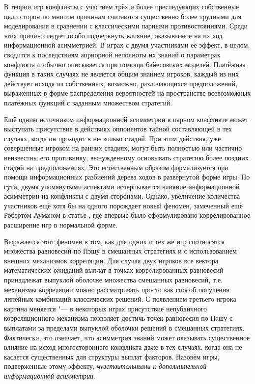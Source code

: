 
{\actuality} В теории игр конфликты с участием трёх и более преследующих собственные цели сторон по многим причинам считаются существенно более трудными для моделирования в сравнении с классическими парными противостояниями. Среди этих причин следует особо подчеркнуть влияние, оказываемое на их ход информационной асимметрией. В играх с двумя участниками её эффект, в целом, сводится к последствиям априорной неполноты их знаний о параметрах конфликта и обычно описывается при помощи байесовских моделей. Платёжная функция в таких случаях не является общим знанием игроков, каждый из них действует исходя из собственных, возможно, различающихся предположений, выраженных в форме распределения вероятностей на пространстве всевозможных платёжных функций с заданным множеством стратегий.

Ещё одним источником информационной асимметрии в парном конфликте может выступать присутствие в действиях оппонентов тайной составляющей в тех случаях, когда он проходит в несколько стадий. При этом действия, уже совершённые игроком на ранних стадиях, могут быть полностью или частично неизвестны его противнику, вынужденному основывать стратегию более поздних стадий на предположениях. Это естественным образом формализуется при помощи информационных разбиений дерева ходов в развёрнутой форме игры. По сути, двумя упомянутыми аспектами исчерпывается влияние информационной асимметрии на конфликты с двумя сторонами. Однако, увеличение количества участников ещё хотя бы на одного порождает новый феномен, замеченный ещё Робертом Ауманом в статье \ifsynopsis\smartcite{Aumann74}\else\cite{Aumann74}\fi, где впервые было сформулировано коррелированное расширение игр в нормальной форме.

Выражается этот феномен в том, как для одних и тех же игр соотносятся множества равновесий по Нэшу в смешанных стратегиях и с использованием внешних механизмов корреляции. Для случая двух игроков все вектора математических ожиданий выплат в точках коррелированных равновесий принадлежат выпуклой оболочке множества смешанных равновесий, т.\:е. механизмы корреляции можно рассматривать просто как способ получения линейных комбинаций классических решений. С появлением третьего игрока картина меняется "--- в некоторых играх присутствие непубличного корреляционного механизма позволяет достичь точек равновесия по Нэшу с выплатами за пределами выпуклой оболочки решений в смешанных стратегиях. Фактически, это означает, что асимметрия знаний может оказывать существенное влияние на исход многостороннего конфликта даже в тех случаях, когда она не касается существенных для структуры выплат факторов. Назовём игры, подверженные этому эффекту, \emph{чувствительными к дополнительной информационной асимметрии}.

